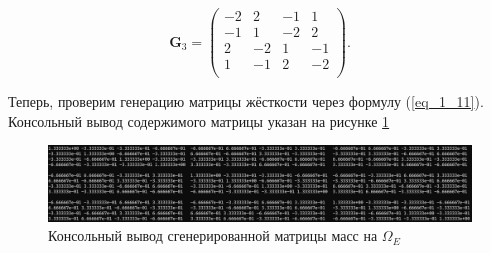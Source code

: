 \begin{equation*}
	\textbf{G}_3 = \left(
	\begin{array}{rrrr}
		-2 & 2 & -1 & 1 \\
		-1 & 1 & -2 & 2 \\
		2 & -2 & 1 & -1 \\
		1 & -1 & 2 & -2 \\
	\end{array}
	\right).
\end{equation*}

Теперь, проверим генерацию матрицы жёсткости через формулу (\ref{eq_1_11}). Консольный вывод содержимого матрицы указан на рисунке \ref{fig:GeneratedMatrixStiffness}

\begin{figure}
	\centering
	\vspace*{0.7cm}
	\includegraphics[width=1.0\linewidth]{images/G.png}
	\caption{Консольный вывод сгенерированной матрицы масс на $\Omega_E$}
	\label{fig:GeneratedMatrixStiffness}
\end{figure}










